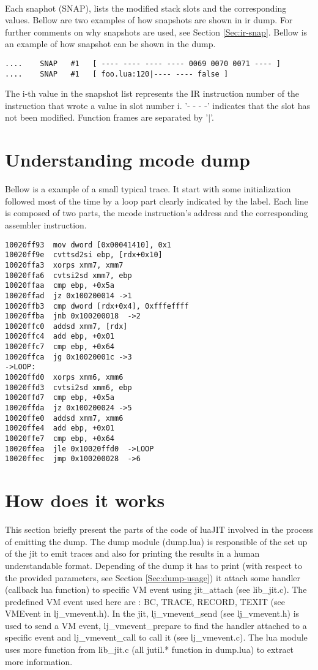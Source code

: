 \\
Each snaphot (SNAP), lists the modified stack slots and the corresponding values.
Bellow are two examples of how snapshots are shown in ir dump. For further
comments on why snapshots are used, see Section \ref{Sec:ir-snap}. Bellow is an
example of how snapshot can be shown in the dump.
\begin{verbatim}
....    SNAP   #1   [ ---- ---- ---- ---- 0069 0070 0071 ---- ]
....    SNAP   #1   [ foo.lua:120|---- ---- false ]
\end{verbatim}
The i-th value in the snapshot list represents the IR instruction number of the
instruction that wrote a value in slot number i. '- - - -' indicates that the slot
has not been modified. Function frames are separated by '$\vert$'.


\section{Understanding mcode dump}
\label{Sec:dump-mcode}
Bellow is a example of a small typical trace. It start with some initialization
followed most of the time by a loop part clearly indicated by the label.
Each line is composed of two parts, the mcode instruction's address and the
corresponding assembler instruction.
\begin{verbatim}
10020ff93  mov dword [0x00041410], 0x1
10020ff9e  cvttsd2si ebp, [rdx+0x10]
10020ffa3  xorps xmm7, xmm7
10020ffa6  cvtsi2sd xmm7, ebp
10020ffaa  cmp ebp, +0x5a
10020ffad  jz 0x100200014 ->1
10020ffb3  cmp dword [rdx+0x4], 0xfffeffff
10020ffba  jnb 0x100200018  ->2
10020ffc0  addsd xmm7, [rdx]
10020ffc4  add ebp, +0x01
10020ffc7  cmp ebp, +0x64
10020ffca  jg 0x10020001c ->3
->LOOP:
10020ffd0  xorps xmm6, xmm6
10020ffd3  cvtsi2sd xmm6, ebp
10020ffd7  cmp ebp, +0x5a
10020ffda  jz 0x100200024 ->5
10020ffe0  addsd xmm7, xmm6
10020ffe4  add ebp, +0x01
10020ffe7  cmp ebp, +0x64
10020ffea  jle 0x10020ffd0  ->LOOP
10020ffec  jmp 0x100200028  ->6
\end{verbatim}

\section{How does it works}
\label{Sec:dump-internals}

This section briefly present the parts of the code of luaJIT involved in the process of
emitting the dump. The dump module (dump.lua) is responsible of the set up of the
jit to emit traces and also for printing the results in a human understandable
format. Depending of the dump it has to print (with respect to the provided
parameters, see Section \ref{Sec:dump-usage}) it attach some handler
(callback lua function) to specific VM event using jit\_attach (see lib\_jit.c).
The predefined VM event used here are : BC, TRACE, RECORD, TEXIT
(see VMEvent in lj\_vmevent.h). In the jit, lj\_vmevent\_send (see lj\_vmevent.h)
is used to send a VM event, lj\_vmevent\_prepare to find the handler attached to a
specific event and lj\_vmevent\_call to call it (see lj\_vmevent.c).
The lua module uses more function from lib\_jit.c (all jutil.* function
in dump.lua) to extract more information.
